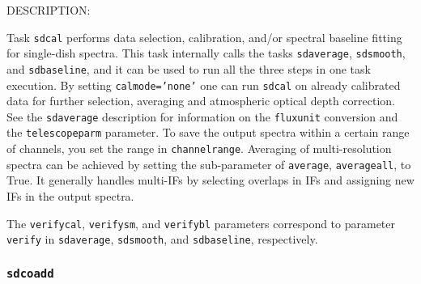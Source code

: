 DESCRIPTION:

    Task {\tt sdcal} performs data selection, calibration, and/or spectral
    baseline fitting for single-dish spectra. This task internally calls the
    tasks {\tt sdaverage}, {\tt sdsmooth}, and {\tt sdbaseline}, and it can be used to run all the
    three steps in one task execution.
    By setting {\tt calmode='none'}
    one can run {\tt sdcal} on already calibrated data for further selection, averaging and atmospheric optical depth correction.
    See the {\tt sdaverage} description for information on the {\tt fluxunit} 
    conversion and the {\tt telescopeparm} parameter.
    To save the output spectra within a certain range of 
    channels, you set the range in {\tt channelrange}. 
    Averaging of multi-resolution
    spectra can be achieved by setting the sub-parameter of {\tt average}, {\tt averageall}, 
    to True. It generally handles multi-IFs by selecting overlaps in IFs and assigning
    new IFs in the output spectra. 
       
    
    The {\tt verifycal}, {\tt verifysm}, and {\tt verifybl}  parameters correspond to parameter
    {\tt  verify} in {\tt sdaverage}, {\tt sdsmooth}, and {\tt sdbaseline}, respectively. 
 

\subsubsection{{\tt sdcoadd}}
\label{section:sd.sdtasks.tasks.sdcoadd}

